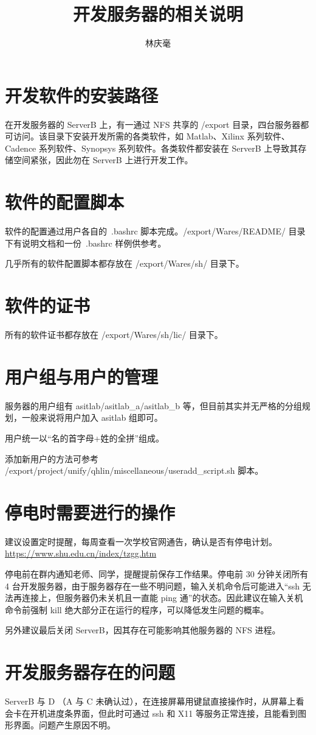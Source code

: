 \documentclass{article}
\begin{document}
\author{林庆毫}
\title{开发服务器的相关说明}
\maketitle
\tableofcontents
\newpage
{}

\section{开发软件的安装路径}
在开发服务器的 ServerB 上，有一通过 NFS 共享的 /export 目录，四台服务器都可访问。该目录下安装开发所需的各类软件，如 Matlab、Xilinx 系列软件、Cadence 系列软件、Synopsys 系列软件。各类软件都安装在 ServerB 上导致其存储空间紧张，因此勿在 ServerB 上进行开发工作。

\section{软件的配置脚本}
软件的配置通过用户各自的\ .bashrc 脚本完成。/export/Wares/README/ 目录下有说明文档和一份\ .bashrc 样例供参考。

几乎所有的软件配置脚本都存放在 /export/Wares/sh/ 目录下。

\section{软件的证书}
所有的软件证书都存放在 /export/Wares/sh/lic/ 目录下。

\section{用户组与用户的管理}
服务器的用户组有 asitlab/asitlab\_a/asitlab\_b 等，但目前其实并无严格的分组规划，一般来说将用户加入 asitlab 组即可。

用户统一以“名的首字母+姓的全拼”组成。

添加新用户的方法可参考 /export/project/unify/qhlin/miscellaneous/useradd\_script.sh 脚本。

\section{停电时需要进行的操作}
建议设置定时提醒，每周查看一次学校官网通告，确认是否有停电计划。
\url{https://www.shu.edu.cn/index/tzgg.htm}

停电前在群内通知老师、同学，提醒提前保存工作结果。停电前 30 分钟关闭所有 4 台开发服务器，由于服务器存在一些不明问题，输入关机命令后可能进入“ssh 无法再连接上，但服务器仍未关机且一直能 ping 通”的状态。因此建议在输入关机命令前强制 kill 绝大部分正在运行的程序，可以降低发生问题的概率。

另外建议最后关闭 ServerB，因其存在可能影响其他服务器的 NFS 进程。

\section{开发服务器存在的问题}
ServerB 与 D （A 与 C 未确认过），在连接屏幕用键鼠直接操作时，从屏幕上看会卡在开机进度条界面，但此时可通过 ssh 和 X11 等服务正常连接，且能看到图形界面。问题产生原因不明。
\end{document}
